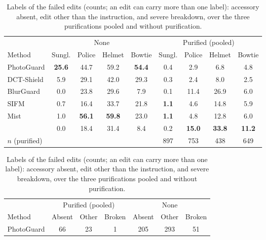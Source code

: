 \begin{table}[t]
  \begin{minipage}[t]{0.50\textwidth}
  \centering
  \scriptsize
  \setlength{\tabcolsep}{2.5pt}
  \caption{Immunization success rate (\%) per instruction, without purification and over the three purifications pooled. $n$: cells whose undefended edit succeeds after purification. Highest per column in bold.}
  \label{tab:supp_isr_prompt}
  \begin{tabular}{@{}l cccc cccc@{}}
    \toprule
    & \multicolumn{4}{c}{None} & \multicolumn{4}{c}{Purified (pooled)} \\
    \cmidrule(lr){2-5} \cmidrule(l){6-9}
    Method & Sungl. & Police & Helmet & Bowtie & Sungl. & Police & Helmet & Bowtie \\
    \midrule
    PhotoGuard & \textbf{25.6} & 44.7 & 59.2 & \textbf{54.4} & 0.4 & 2.9 & 6.8 & 4.8 \\
    DCT-Shield & 5.9 & 29.1 & 42.0 & 29.3 & 0.3 & 2.4 & 8.0 & 2.5 \\
    BlurGuard & 0.0 & 23.8 & 29.6 & 7.9 & 0.1 & 11.4 & 26.9 & 6.0 \\
    SIFM & 0.7 & 16.4 & 33.7 & 21.8 & \textbf{1.1} & 4.6 & 14.8 & 5.9 \\
    Mist & 1.0 & \textbf{56.1} & \textbf{59.8} & 23.0 & \textbf{1.1} & 4.8 & 12.8 & 6.0 \\
    \midrule
    \rowcolor{oursrow}
    \capg{} & 0.0 & 18.4 & 31.4 & 8.4 & 0.2 & \textbf{15.0} & \textbf{33.8} & \textbf{11.2} \\
    \midrule
    $n$ (purified) & & & & & 897 & 753 & 438 & 649 \\
    \bottomrule
  \end{tabular}
  \end{minipage}\hfill
  \begin{minipage}[t]{0.46\textwidth}
  \centering
  \footnotesize
  \setlength{\tabcolsep}{4pt}
  \caption{Labels of the failed edits (counts; an edit can carry more than one label): accessory absent, edit other than the instruction, and severe breakdown, over the three purifications pooled and without purification.}
  \label{tab:supp_isr_kinds}
  \begin{tabular}{@{}l ccc ccc@{}}
    \toprule
    & \multicolumn{3}{c}{Purified (pooled)} & \multicolumn{3}{c}{None} \\
    \cmidrule(lr){2-4} \cmidrule(l){5-7}
    Method & Absent & Other & Broken & Absent & Other & Broken \\
    \midrule
    PhotoGuard & 66 & 23 & 1 & 205 & 293 & 51 \\

\end{tabular}
\end{minipage}
\end{table}
